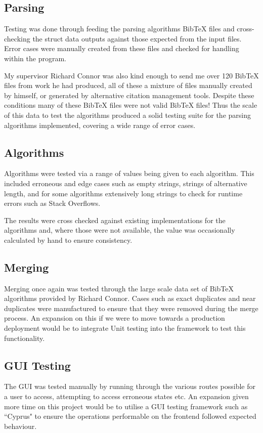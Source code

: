 \documentclass[a4paper,11pt]{article}
\begin{document}
\subsection{Parsing}
Testing was done through feeding the parsing algorithms BibTeX files and cross-checking the struct data outputs against those expected from the input files. Error cases were manually created from these files and checked for handling within the program.

My supervisor Richard Connor was also kind enough to send me over 120 BibTeX files from work he had produced, all of these a mixture of files manually created by himself, or generated by alternative citation management tools. Despite these conditions many of these BibTeX files were not valid BibTeX files! Thus the scale of this data to test the algorithms produced a solid testing suite for the parsing algorithms implemented, covering a wide range of error cases.

\subsection{Algorithms}
Algorithms were tested via a range of values being given to each algorithm. This included erroneous and edge cases such as empty strings, strings of alternative length, and for some algorithms extensively long strings to check for runtime errors such as Stack Overflows.

The results were cross checked against existing implementations for the algorithms and, where those were not available, the value was occasionally calculated by hand to ensure consistency.

\subsection{Merging}
Merging once again was tested through the large scale data set of BibTeX algorithms provided by Richard Connor. Cases such as exact duplicates and near duplicates were manufactured to ensure that they were removed during the merge process. An expansion on this if we were to move towards a production deployment would be to integrate Unit testing into the framework to test this functionality.

\subsection{GUI Testing}
The GUI was tested manually by running through the various routes possible for a user to access, attempting to access erroneous states etc. An expansion given more time on this project would be to utilise a GUI testing framework such as ``Cyprus" to ensure the operations performable on the frontend followed expected behaviour.
\end{document}

